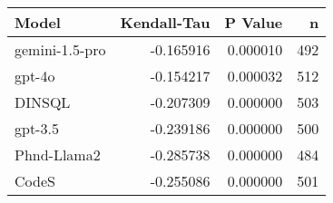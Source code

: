 \begin{tabular}{lrrr}
\toprule
Model & Kendall-Tau & P Value & n \\
\midrule
gemini-1.5-pro & -0.165916 & 0.000010 & 492 \\
gpt-4o & -0.154217 & 0.000032 & 512 \\
DINSQL & -0.207309 & 0.000000 & 503 \\
gpt-3.5 & -0.239186 & 0.000000 & 500 \\
Phnd-Llama2 & -0.285738 & 0.000000 & 484 \\
CodeS & -0.255086 & 0.000000 & 501 \\
\bottomrule
\end{tabular}
